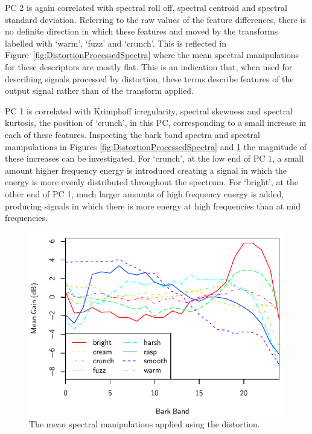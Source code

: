 			PC 2 is again correlated with spectral roll off, spectral centroid and spectral standard deviation.
			Referring to the raw values of the feature differences, there is no definite direction in which
			these features and moved by the transforms labelled with `warm', `fuzz' and `crunch'. This is
			reflected in Figure~\ref{fig:DistortionProcessedSpectra} where the mean spectral manipulations for
			these descriptors are mostly flat. This is an indication that, when used for describing signals
			processed by distortion, these terms describe features of the output signal rather than of the
			transform applied.

			PC 1 is correlated with Krimphoff irregularity, spectral skewness and spectral kurtosis, the
			position of `crunch', in this PC, corresponding to a small increase in each of these features.
			Inspecting the bark band spectra and spectral manipulations in Figures
			\ref{fig:DistortionProcessedSpectra} and \ref{fig:DistortionDifferenceSpectra} the magnitude of
			these increases can be investigated. For `crunch', at the low end of PC 1, a small amount higher
			frequency energy is introduced creating a signal in which the energy is more evenly distributed
			throughout the spectrum. For `bright', at the other end of PC 1, much larger amounts of high
			frequency energy is added, producing signals in which there is more energy at high frequencies than
			at mid frequencies.

			\begin{figure}[h!]
				\centering
				\includegraphics{chapter4/Images/DistortionDifferenceSpectra.pdf}
				\caption{The mean spectral manipulations applied using the distortion.}
				\label{fig:DistortionDifferenceSpectra}
			\end{figure}

